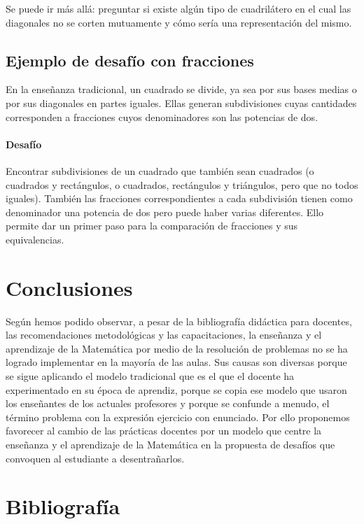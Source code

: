\documentclass[oneside,spanish]{amsart}
\numberwithin{equation}{section}
\numberwithin{figure}{section}
\theoremstyle{definition}
\begin{document}
Se puede ir más allá: preguntar si existe algún tipo de cuadrilátero en el cual las diagonales no se corten mutuamente y cómo sería una representación del mismo.

\subsection{Ejemplo de desafío con fracciones}

En la enseñanza tradicional, un cuadrado se divide, ya sea por sus bases medias o por sus diagonales en partes iguales. Ellas generan subdivisiones cuyas cantidades corresponden a fracciones cuyos denominadores son las potencias de dos. 

\paragraph{\bfseries Desafío}

Encontrar subdivisiones de un cuadrado que también sean cuadrados (o cuadrados y rectángulos, o cuadrados, rectángulos y triángulos, pero que no todos iguales). También las fracciones correspondientes a cada subdivisión tienen como denominador una potencia de dos pero puede haber varias diferentes. Ello permite dar un primer paso para la comparación de fracciones y sus equivalencias.

\section{Conclusiones}

Según hemos podido observar, a pesar de la bibliografía didáctica para docentes, las recomendaciones metodológicas y las capacitaciones, la enseñanza y el aprendizaje de la Matemática por medio de la resolución de problemas no se ha logrado implementar en la mayoría de las aulas. Sus causas son diversas porque se sigue aplicando el modelo tradicional que es el que el docente ha experimentado en su época de aprendiz, porque se copia ese modelo que usaron los enseñantes de los actuales profesores y porque se confunde a menudo, el término problema con la expresión ejercicio con enunciado. Por ello proponemos favorecer al cambio de las prácticas docentes por un modelo que centre la enseñanza y el aprendizaje de la Matemática en la propuesta de desafíos que convoquen al estudiante a desentrañarlos.

\section{Bibliografía}

\nocite{*}
\printbibliography
\end{document}
